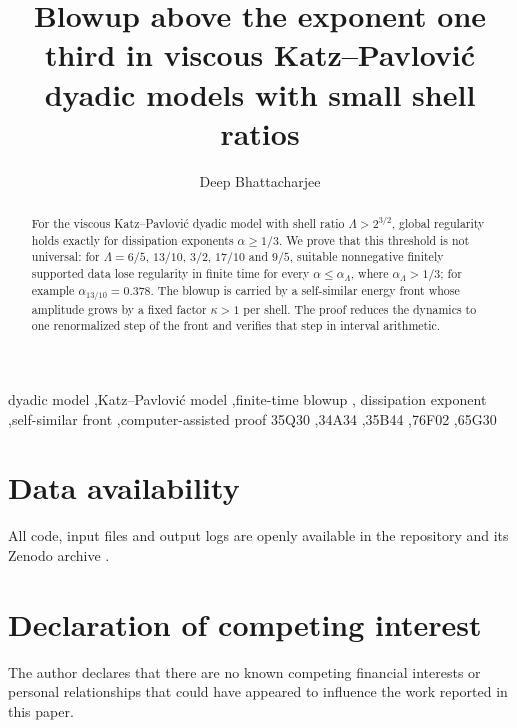 \documentclass[preprint,12pt]{elsarticle}
\numberwithin{equation}{section}
\begin{document}
\begin{frontmatter}

\title{Blowup above the exponent one third in viscous Katz--Pavlovi\'c dyadic
models with small shell ratios}

\author{Deep Bhattacharjee}

\begin{abstract}
For the viscous Katz--Pavlovi\'c dyadic model with shell ratio
$\Lambda>2^{3/2}$, global regularity holds exactly for dissipation
exponents $\alpha\ge1/3$. We prove that this threshold is not universal:
for $\Lambda=6/5$, $13/10$, $3/2$, $17/10$ and $9/5$, suitable
nonnegative finitely supported data lose regularity in finite time for
every $\alpha\le\alpha_\Lambda$, where $\alpha_\Lambda>1/3$; for example
$\alpha_{13/10}=0.378$. The blowup is carried by a self-similar energy
front whose amplitude grows by a fixed factor $\kappa>1$ per shell. The
proof reduces the dynamics to one renormalized step of the front and
verifies that step in interval arithmetic.
\end{abstract}

\begin{keyword}
dyadic model \sep Katz--Pavlovi\'c model \sep finite-time blowup \sep
dissipation exponent \sep self-similar front \sep computer-assisted proof
\MSC[2020] 35Q30 \sep 34A34 \sep 35B44 \sep 76F02 \sep 65G30
\end{keyword}

\end{frontmatter}


\section*{Data availability}
All code, input files and output logs are openly available in the
repository and its Zenodo archive \cite{Data}.

\section*{Declaration of competing interest}
The author declares that there are no known competing financial interests or
personal relationships that could have appeared to influence the work
reported in this paper.
\end{document}
